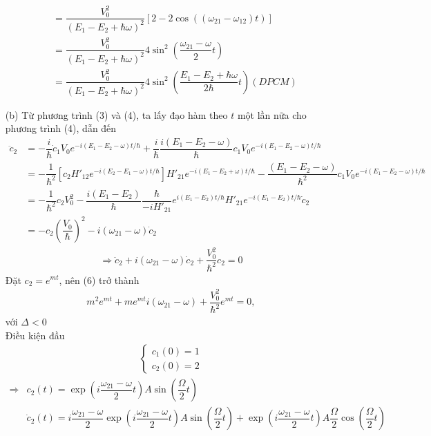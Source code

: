 \documentclass{article}
\newcommand{\f}[2]{\dfrac{#1}{#2}}
\begin{document}
\begin{enumerate}
\begin{align*}
		&= \f{V_{0}^2}{(E_{1} - E_{2} + \hbar \omega)^2} \left[2 - 2\cos((\omega_{21} - \omega_{12})t)\right] \\
		&= \f{V_{0}^2}{(E_{1} - E_{2} + \hbar \omega)^2} 4 \sin^2\left( \f{\omega_{21} - \omega}{2}t \right) \\
		&= \f{V_{0}^2}{(E_{1} - E_{2} + \hbar \omega)^2} 4 \sin^2\left( \f{E_{1} - E_{2} + \hbar\omega}{2\hbar}t \right) (DPCM)
	\end{align*}
	\item [(b)] Từ phương trình (3) và (4), ta lấy đạo hàm theo $t$ một lần nữa cho phương trình (4), dẫn đến
	\begin{align*}
		\ddot{c}_{2} 
		&= - \f{i}{\hbar} \dot{c}_{1}V_{0} e^{-i(E_1 - E_2 - \omega) t / \hbar} + \f{i}{\hbar}\f{i(E_{1} - E_{2} - \omega)}{\hbar} c_{1} V_{0} e^{-i(E_1 - E_2 - \omega) t / \hbar} \\
		&= - \f{1}{\hbar^2} \left[ c_{2} H'_{12} e^{-i(E_2 - E_1 - \omega) t / \hbar} \right]H'_{21} e^{-i(E_1 - E_2 + \omega) t / \hbar} - \f{(E_{1} - E_{2} - \omega)}{\hbar^2} c_{1} V_{0} e^{-i(E_1 - E_2 - \omega) t / \hbar} \\
		&= - \f{1}{\hbar^2} c_{2} V_{0}^2  - \f{i(E_{1} - E_{2})}{\hbar}\f{\hbar}{-i H'_{21}}e^{i(E_1 - E_2) t / \hbar} H'_{21} e^{-i(E_1 - E_2) t / \hbar} \dot{c}_{2} \\
		&= -c_{2} \left(\f{V_{0}}{\hbar}\right)^2 - i (\omega_{21} - \omega)\dot{c}_{2}
	\end{align*}
	\begin{align*}
		\Rightarrow \ddot{c}_{2} + i(\omega_{21} - \omega)\dot{c}_{2} + \f{V_{0}^2}{\hbar^2}c_{2} = 0 \tag{6}
	\end{align*}
	Đặt $c_{2} = e^{mt}$, nên (6) trở thành
	\begin{align*}
		m^{2} e^{mt} + m e^{mt} i(\omega_{21} - \omega) +  \f{V_{0}^2}{\hbar^2} e^{mt} = 0 ,
	\end{align*}
	với $\Delta <0 $\\
	Điều kiện đầu
	\begin{align*}
		\begin{cases}
			c_{1}(0) = 1 \\
			c_{2}(0) = 2
		\end{cases}
	\end{align*}
	\begin{align*}
		\Rightarrow 
		&c_{2}(t) = \exp(i \f{\omega_{21} - \omega }{2} t) A \sin\left(\f{\Omega}{2}t\right)\\
		&\dot{c}_{2}(t) = i \f{\omega_{21} - \omega}{2}\exp\left(i \f{\omega_{21} - \omega}{2}t\right)A \sin\left(\f{\Omega}{2}t\right) + \exp\left(i \f{\omega_{21} - \omega}{2}t\right)A\f{\Omega}{2} \cos\left(\f{\Omega}{2}t\right)

\end{align*}
\end{enumerate}
\end{document}
